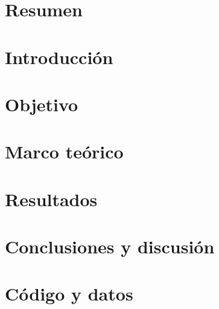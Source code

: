 \documentclass[12pt,letterpaper]{article}
\begin{document}

\tableofcontents
\pagebreak
\section{Resumen}

\section{Introducción}

\section{Objetivo}

\section{Marco teórico}

\section{Resultados}

\section{Conclusiones y discusión}

\section{Código y datos}


\nocite{*}

\end{document}
